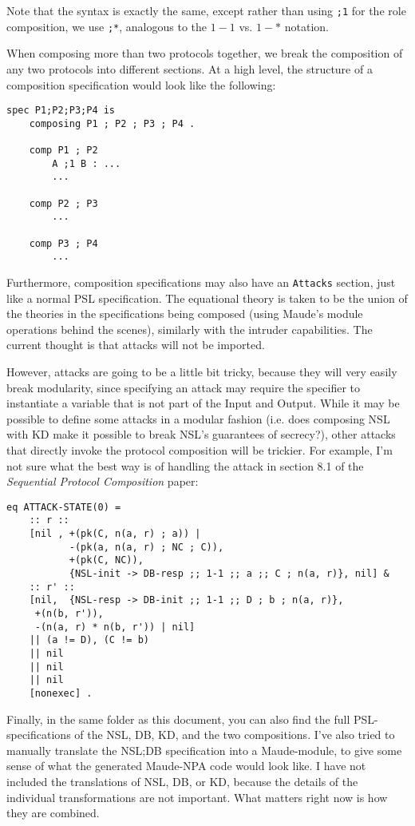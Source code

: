 \documentclass{article}
\begin{document}
Note that the syntax is exactly the same, except rather than using
\verb|;1| for the role composition, we use \verb|;*|, analogous to 
the $1-1$ vs. $1-*$ notation.

When composing more than two protocols together, we break the composition
of any two protocols into different sections. At a high level, the 
structure of a composition specification would look like the following:

\begin{verbatim}
spec P1;P2;P3;P4 is
    composing P1 ; P2 ; P3 ; P4 .

    comp P1 ; P2
        A ;1 B : ...
        ...

    comp P2 ; P3
        ...

    comp P3 ; P4
        ...

\end{verbatim}

Furthermore, composition specifications may also have an \verb|Attacks| 
section, just like a normal PSL specification. The equational theory is taken
to be the union of the theories in the specifications being composed (using 
Maude's module operations behind the scenes), similarly with the intruder
capabilities. The current thought is that attacks will not be imported. 

However, attacks are going to be a little bit tricky, because they will very 
easily break modularity, since specifying an attack
may require the specifier to instantiate a variable that is not part of the 
Input and Output. While it may be possible to define some attacks in a modular
fashion (i.e. does composing NSL with KD make it possible to break NSL's 
guarantees of secrecy?), other attacks that directly invoke the protocol
composition will be trickier. For example, I'm not sure what the best way is of 
handling the attack in section 8.1 of 
the \textit{Sequential Protocol Composition} paper:
\begin{verbatim}
eq ATTACK-STATE(0) = 
    :: r :: 
    [nil , +(pk(C, n(a, r) ; a)) | 
           -(pk(a, n(a, r) ; NC ; C)),
           +(pk(C, NC)),
           {NSL-init -> DB-resp ;; 1-1 ;; a ;; C ; n(a, r)}, nil] &
    :: r' ::
    [nil,  {NSL-resp -> DB-init ;; 1-1 ;; D ; b ; n(a, r)},
     +(n(b, r')),
     -(n(a, r) * n(b, r')) | nil]
    || (a != D), (C != b)
    || nil
    || nil
    || nil
    [nonexec] .
\end{verbatim}

Finally, in the same folder as this document, you can also find the full 
PSL-specifications of the NSL, DB, KD, and the two compositions. I've also
tried to manually translate the NSL;DB specification into a Maude-module,
to give some sense of what the generated Maude-NPA code would look like. I
have not included the translations of NSL, DB, or KD, because the details of 
the individual transformations are not important. What matters right now is how 
they are combined. 
\end{document}
